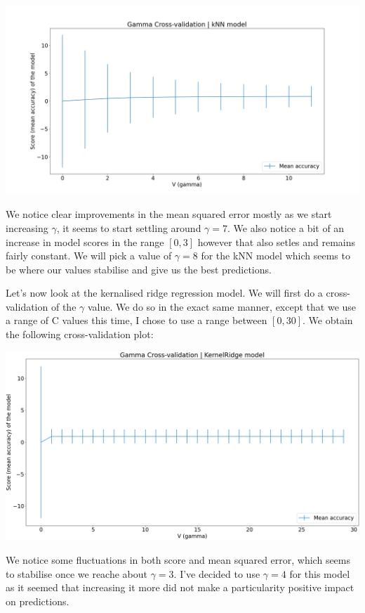 \documentclass[10pt]{article}
\begin{document}
\begin{center}
    \includegraphics[scale=0.27]{knn_crossval.png}
\end{center}

We notice clear improvements in the mean squared error mostly as we start increasing $\gamma$, it seems
to start settling around $\gamma = 7$. We also notice a bit of an increase in model scores in the range 
$[0, 3]$ however that also setles and remains fairly constant. We will pick a value of $\gamma = 8$ for the
kNN model which seems to be where our values stabilise and give us the best predictions.

Let's now look at the kernalised ridge regression model. We will first do a cross-validation of the $\gamma$ value.
We do so in the exact same manner, except that we use a range of C values this time, I chose to use a range between
$[0, 30]$. We obtain the following cross-validation plot:

\begin{center}
    \includegraphics[scale=0.27]{kridge_crossval_gamma.png}
\end{center}

We notice some fluctuations in both score and mean squared error, which seems to stabilise once we reache about
$\gamma = 3$. I've decided to use $\gamma = 4$ for this model as it seemed that increasing it more did not make
a particularity positive impact on predictions.
\end{document}
